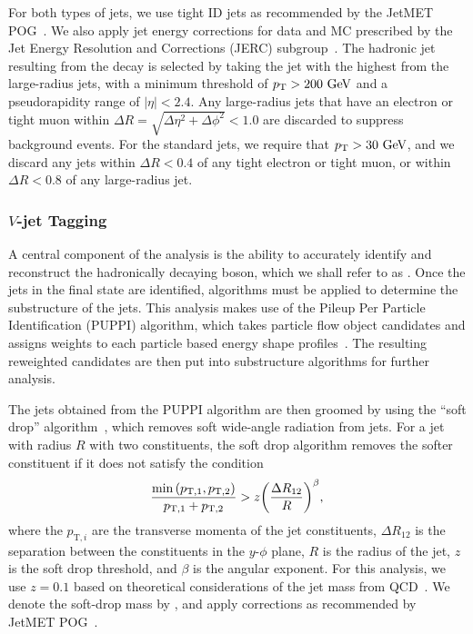 For both types of jets, we use tight ID jets as recommended by the JetMET POG~\cite{jetID2016,jetID2017,jetID2018}.
We also apply jet energy corrections for data and MC prescribed by the Jet Energy Resolution and Corrections (JERC) subgroup~\cite{JetEnergyScale}.
The hadronic jet resulting from the \VorH decay is selected by taking the jet with the highest \pt from the large-radius jets, with a minimum threshold of $\pt>200\unit{GeV}$ and a pseudorapidity range of $|\eta|<2.4$.
Any large-radius jets that have an electron or tight muon within $\Delta R=\sqrt{\Delta\eta^2+\Delta\phi^2}<1.0$ are discarded to suppress background events.
For the standard jets, we require that $\pt>30\unit{GeV}$, and we discard any jets within $\Delta R<0.4$ of any tight electron or tight muon, or within $\Delta R<0.8$ of any large-radius jet.

\subsubsection{$V$-jet Tagging}

A central component of the analysis is the ability to accurately identify and reconstruct the hadronically decaying \VorH boson, which we shall refer to as \Vhad.
Once the jets in the final state are identified, algorithms must be applied to determine the substructure of the jets.
This analysis makes use of the Pileup Per Particle Identification (PUPPI) algorithm, which takes particle flow object candidates and assigns weights to each particle based energy shape profiles~\cite{Bertolini_2014}.
The resulting reweighted candidates are then put into substructure algorithms for further analysis.

The jets obtained from the PUPPI algorithm are then groomed by using the ``soft drop'' algorithm~\cite{Larkoski_2014}, which removes soft wide-angle radiation from jets.
For a jet with radius $R$ with two constituents, the soft drop algorithm removes the softer constituent if it does not satisfy the condition
\begin{equation}
  \frac{\min\pqty{p_{\mathrm{T},1},p_{\mathrm{T},2}}}{p_{\mathrm{T},1}+p_{\mathrm{T},2}}>z\pqty{\frac{\Delta R_{12}}{R}}^\beta,
\end{equation}
where the $p_{\mathrm{T},i}$ are the transverse momenta of the jet constituents, $\Delta R_{12}$ is the separation between the constituents in the $y$-$\phi$ plane, $R$ is the radius of the jet, $z$ is the soft drop threshold, and $\beta$ is the angular exponent.
For this analysis, we use $z=0.1$ based on theoretical considerations of the jet mass from QCD~\cite{Dasgupta_2013,Dasgupta_2013_2}.
We denote the soft-drop mass by \MJ, and apply corrections as recommended by JetMET POG~\cite{WZ-tagging}.


